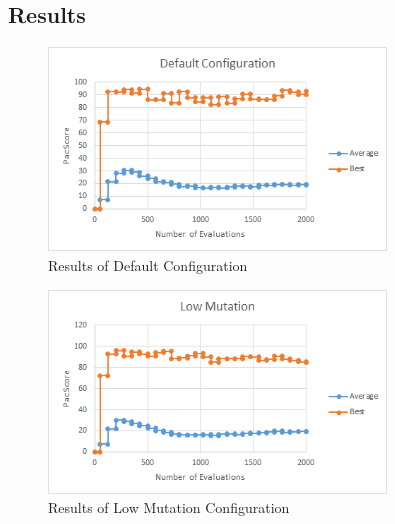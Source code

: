 \documentclass{article}
\begin{document}
\clearpage
\subsection{Results}
\begin{flushleft}
\begin{figure}[h]
	\centering
	\includegraphics[width=0.8\textwidth]{default}
	\caption{Results of Default Configuration}
\end{figure}

\begin{figure}[h]
	\centering
	\includegraphics[width=0.8\textwidth]{lowMut}
	\caption{Results of Low Mutation Configuration}
\end{figure}
\end{flushleft}

\clearpage
\end{document}
